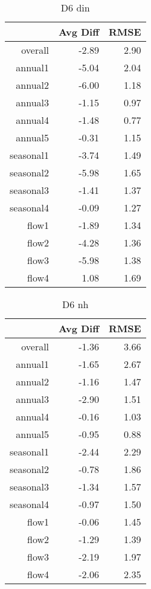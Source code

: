 \begin{table}[H]
\centering
\begin{tabular}{rrr}
  \hline
 & Avg Diff & RMSE \\ 
  \hline
overall & -2.89 & 2.90 \\ 
  annual1 & -5.04 & 2.04 \\ 
  annual2 & -6.00 & 1.18 \\ 
  annual3 & -1.15 & 0.97 \\ 
  annual4 & -1.48 & 0.77 \\ 
  annual5 & -0.31 & 1.15 \\ 
  seasonal1 & -3.74 & 1.49 \\ 
  seasonal2 & -5.98 & 1.65 \\ 
  seasonal3 & -1.41 & 1.37 \\ 
  seasonal4 & -0.09 & 1.27 \\ 
  flow1 & -1.89 & 1.34 \\ 
  flow2 & -4.28 & 1.36 \\ 
  flow3 & -5.98 & 1.38 \\ 
  flow4 & 1.08 & 1.69 \\ 
   \hline
\end{tabular}
\caption{D6 din} 
\end{table}
\begin{table}[H]
\centering
\begin{tabular}{rrr}
  \hline
 & Avg Diff & RMSE \\ 
  \hline
overall & -1.36 & 3.66 \\ 
  annual1 & -1.65 & 2.67 \\ 
  annual2 & -1.16 & 1.47 \\ 
  annual3 & -2.90 & 1.51 \\ 
  annual4 & -0.16 & 1.03 \\ 
  annual5 & -0.95 & 0.88 \\ 
  seasonal1 & -2.44 & 2.29 \\ 
  seasonal2 & -0.78 & 1.86 \\ 
  seasonal3 & -1.34 & 1.57 \\ 
  seasonal4 & -0.97 & 1.50 \\ 
  flow1 & -0.06 & 1.45 \\ 
  flow2 & -1.29 & 1.39 \\ 
  flow3 & -2.19 & 1.97 \\ 
  flow4 & -2.06 & 2.35 \\ 
   \hline
\end{tabular}
\caption{D6 nh} 
\end{table}
